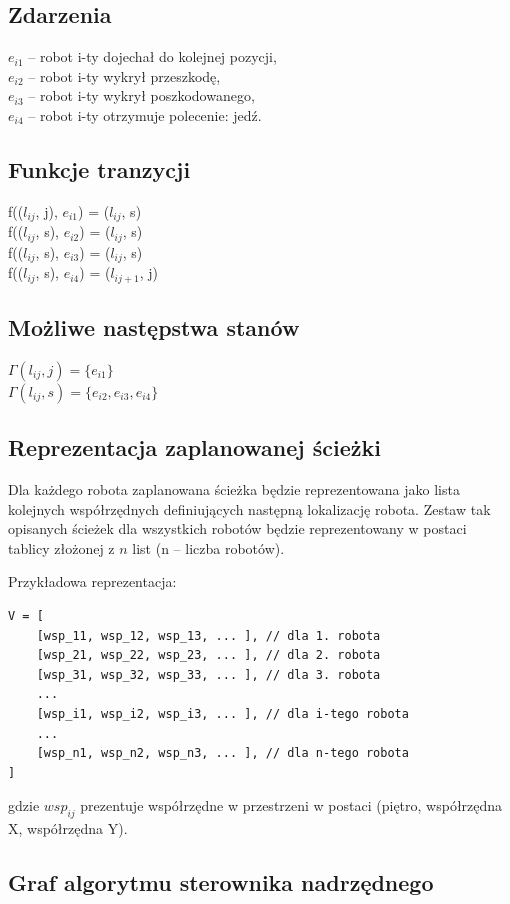 \subsection{Zdarzenia}
$e_{i1}$ -- robot i-ty dojechał do kolejnej pozycji,\\
$e_{i2}$ -- robot i-ty wykrył przeszkodę,\\
$e_{i3}$ -- robot i-ty wykrył poszkodowanego,\\
$e_{i4}$ -- robot i-ty otrzymuje polecenie: jedź.\\

\subsection{Funkcje tranzycji}
f(($l_{ij}$, j), $e_{i1}$) = ($l_{ij}$, s)\\
f(($l_{ij}$, s), $e_{i2}$) = ($l_{ij}$, s)\\
f(($l_{ij}$, s), $e_{i3}$) = ($l_{ij}$, s)\\
f(($l_{ij}$, s), $e_{i4}$) = ($l_{ij+1}$, j)\\

\subsection{Możliwe następstwa stanów}
$\Gamma(l_{ij}, j)=\{e_{i1}\}$\\
$\Gamma(l_{ij}, s)=\{e_{i2}, e_{i3}, e_{i4}\}$

\subsection{Reprezentacja zaplanowanej ścieżki}
Dla każdego robota zaplanowana ścieżka będzie reprezentowana jako lista kolejnych współrzędnych definiujących następną lokalizację robota. Zestaw tak opisanych ścieżek dla wszystkich robotów będzie reprezentowany w postaci tablicy złożonej z $n$ list (n -- liczba robotów).

Przykładowa reprezentacja:
\begin{verbatim}
V = [
    [wsp_11, wsp_12, wsp_13, ... ], // dla 1. robota
    [wsp_21, wsp_22, wsp_23, ... ], // dla 2. robota
    [wsp_31, wsp_32, wsp_33, ... ], // dla 3. robota
    ...
    [wsp_i1, wsp_i2, wsp_i3, ... ], // dla i-tego robota
    ...
    [wsp_n1, wsp_n2, wsp_n3, ... ], // dla n-tego robota
]
\end{verbatim}
gdzie $wsp_{ij}$ prezentuje współrzędne w przestrzeni w postaci (piętro, współrzędna X, współrzędna Y).
\subsection{Graf algorytmu sterownika nadrzędnego}

